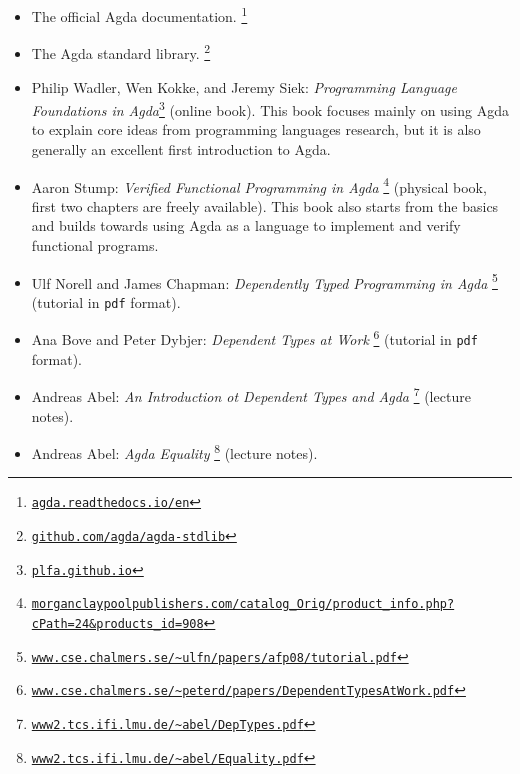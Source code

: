 \documentclass[a4paper,UKenglish]{tufte-handout}
\newcommand{\hrefu}[2]{\href{#1}{\nolinkurl{#2}}}
\theoremstyle{definition}
\begin{document}
\begin{itemize}

\item The official Agda documentation.%
  \footnote{\hrefu{https://agda.readthedocs.io/en/}{agda.readthedocs.io/en}}

\item The Agda standard library.%
  \footnote{\hrefu{https://github.com/agda/agda-stdlib}{github.com/agda/agda-stdlib}}

\item Philip Wadler, Wen Kokke, and Jeremy Siek: \emph{Programming Language
  Foundations in Agda}\footnote{\hrefu{https://plfa.github.io/}{plfa.github.io}} (online
  book). This book focuses mainly on using Agda to explain core ideas
  from programming languages research, but it is also generally an
  excellent first introduction to Agda.

\item Aaron Stump: \emph{Verified Functional Programming in Agda}%
  \footnote{\hrefu{https://www.morganclaypoolpublishers.com/catalog_Orig/product_info.php?cPath=24&products_id=908}{morganclaypoolpublishers.com/catalog_Orig/product_info.php?cPath=24&products_id=908}}
  (physical book, first two chapters are freely available). This book
  also starts from the basics and builds towards using Agda as a
  language to implement and verify functional programs.

\item Ulf Norell and James Chapman: \emph{Dependently Typed
  Programming in Agda}%
  \footnote{\hrefu{http://www.cse.chalmers.se/~ulfn/papers/afp08/tutorial.pdf}{www.cse.chalmers.se/~ulfn/papers/afp08/tutorial.pdf}}
  (tutorial in \texttt{pdf} format).

\item Ana Bove and Peter Dybjer: \emph{Dependent Types at Work}%
  \footnote{\hrefu{http://www.cse.chalmers.se/~peterd/papers/DependentTypesAtWork.pdf}{www.cse.chalmers.se/~peterd/papers/DependentTypesAtWork.pdf}}
  (tutorial in \texttt{pdf} format).

\item Andreas Abel: \emph{An Introduction ot Dependent Types and Agda}%
  \footnote{\hrefu{http://www2.tcs.ifi.lmu.de/~abel/DepTypes.pdf}{www2.tcs.ifi.lmu.de/~abel/DepTypes.pdf}} (lecture notes).

\item Andreas Abel: \emph{Agda Equality}%
  \footnote{\hrefu{http://www2.tcs.ifi.lmu.de/~abel/Equality.pdf}{www2.tcs.ifi.lmu.de/~abel/Equality.pdf}} (lecture
  notes).



\end{itemize}


\end{document}
